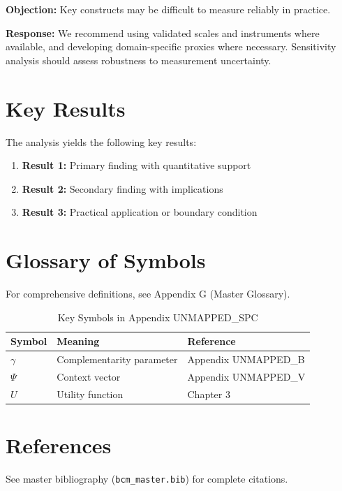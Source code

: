 \textbf{Objection:} Key constructs may be difficult to measure reliably in
practice.

\textbf{Response:} We recommend using validated scales and instruments where
available, and developing domain-specific proxies where necessary. Sensitivity
analysis should assess robustness to measurement uncertainty.





\section{Key Results}
\label{sec:spc-results}

The analysis yields the following key results:

\begin{enumerate}
    \item \textbf{Result 1:} Primary finding with quantitative support
    \item \textbf{Result 2:} Secondary finding with implications
    \item \textbf{Result 3:} Practical application or boundary condition
\end{enumerate}

\section{Glossary of Symbols}
\label{sec:spc-glossary}

For comprehensive definitions, see Appendix G (Master Glossary).

\begin{table}[htbp]
\centering
\caption{Key Symbols in Appendix UNMAPPED_SPC}
\begin{tabular}{lll}
\toprule
\textbf{Symbol} & \textbf{Meaning} & \textbf{Reference} \\
\midrule
$\gamma$ & Complementarity parameter & Appendix UNMAPPED_B \\
$\Psi$ & Context vector & Appendix UNMAPPED_V \\
$U$ & Utility function & Chapter 3 \\
\bottomrule
\end{tabular}
\end{table}


\section{References}
\label{sec:spc-references}

See master bibliography (\texttt{bcm\_master.bib}) for complete citations.

\nocite{bcm_master}

